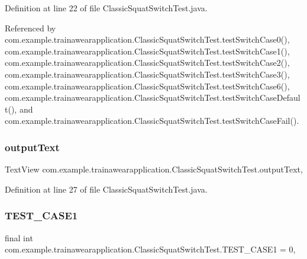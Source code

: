Definition at line 22 of file Classic\+Squat\+Switch\+Test.\+java.



Referenced by com.\+example.\+trainawearapplication.\+Classic\+Squat\+Switch\+Test.\+test\+Switch\+Case0(), com.\+example.\+trainawearapplication.\+Classic\+Squat\+Switch\+Test.\+test\+Switch\+Case1(), com.\+example.\+trainawearapplication.\+Classic\+Squat\+Switch\+Test.\+test\+Switch\+Case2(), com.\+example.\+trainawearapplication.\+Classic\+Squat\+Switch\+Test.\+test\+Switch\+Case3(), com.\+example.\+trainawearapplication.\+Classic\+Squat\+Switch\+Test.\+test\+Switch\+Case6(), com.\+example.\+trainawearapplication.\+Classic\+Squat\+Switch\+Test.\+test\+Switch\+Case\+Default(), and com.\+example.\+trainawearapplication.\+Classic\+Squat\+Switch\+Test.\+test\+Switch\+Case\+Fail().

\mbox{\label{classcom_1_1example_1_1trainawearapplication_1_1_classic_squat_switch_test_a5942ceb5c90ba3b912bb91020e3989ee}} 
\subsubsection{\texorpdfstring{outputText}{outputText}}
{\footnotesize\ttfamily Text\+View com.\+example.\+trainawearapplication.\+Classic\+Squat\+Switch\+Test.\+output\+Text\hspace{0.3cm}{\ttfamily [static]}, {\ttfamily [private]}}



Definition at line 27 of file Classic\+Squat\+Switch\+Test.\+java.

\mbox{\label{classcom_1_1example_1_1trainawearapplication_1_1_classic_squat_switch_test_ad7aca3b01b79d4797ff05766d3e15059}} 
\subsubsection{\texorpdfstring{TEST\_CASE1}{TEST\_CASE1}}
{\footnotesize\ttfamily final int com.\+example.\+trainawearapplication.\+Classic\+Squat\+Switch\+Test.\+T\+E\+S\+T\+\_\+\+C\+A\+S\+E1 = 0\hspace{0.3cm}{\ttfamily [static]}, {\ttfamily [private]}}



